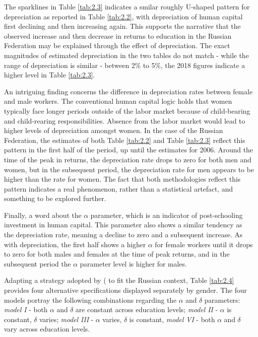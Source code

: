 \documentclass[alpha-refs]{wiley-article-02b}
\begin{document}
\setcounter{table}{3} %

The sparklines in Table \ref{tab:2.3} indicates a smilar roughly U-shaped  pattern for depreciation as reported in Table \ref{tab:2.2}, with depreciation of human capital first declining and then increasing again. This supports the narrative that the observed increase and then decrease in returns to education in the Russian Federation may be explained through the effect of depreciation. The  exact magnitudes of estimated depreciation in the two tables do not match - while the range of depreciation is similar - between 2\% to 5\%, the 2018 figures indicate a higher level in Table \ref{tab:2.3}. 

\vspace{3pt}

An intriguing finding concerns the difference in depreciation rates between female and male workers. The conventional human capital logic holds that women typically face longer periods outside of the labor market because of child-bearing and child-rearing responsibilities. Absence from the labor market would lead to higher levels of depreciation amongst women. In the case of the Russian Federation, the estimates of both Table \ref{tab:2.2} and Table \ref{tab:2.3} reflect this pattern in the first half of the period, up until the estimates for 2006. Around the time of the peak in returns, the depreciation rate drops to zero for both men and women, but in the subsequent period, the depreciation rate for men appears to be higher than the rate for women. The fact that both methodologies reflect this pattern indicates a real phenomenon, rather than a statistical artefact, and something to be explored further. 

\vspace{3pt}

Finally, a word about the $\alpha$ parameter, which is an indicator of post-schooling investment in human capital. This parameter also shows a similar tendency as the depreciation rate, meaning a decline to zero and a subsequent  increase. As with depreciation, the first half shows a higher $\alpha$ for female workers until it drops to zero for both males and females at the time of peak returns, and in the subsequent period the $\alpha$ parameter level is higher for males. 

\vspace{3pt}

Adapting a strategy adopted by (\citet{weber_173._2008} to fit the Russian context, Table \ref{tab:2.4} provides four alternative specifications displayed separately by gender. The four models portray the following combinations regarding the $\alpha$  and $\delta$ parameters: \textit{model I} - both $\alpha$ and $\delta$ are constant across education levels; \textit{model II} - $\alpha$ is constant, $\delta$ varies; \textit{model III} - $\alpha$ varies, $\delta$ is constant, \textit{model VI} - both $\alpha$ and $\delta$ vary across education levels.
\end{document}
